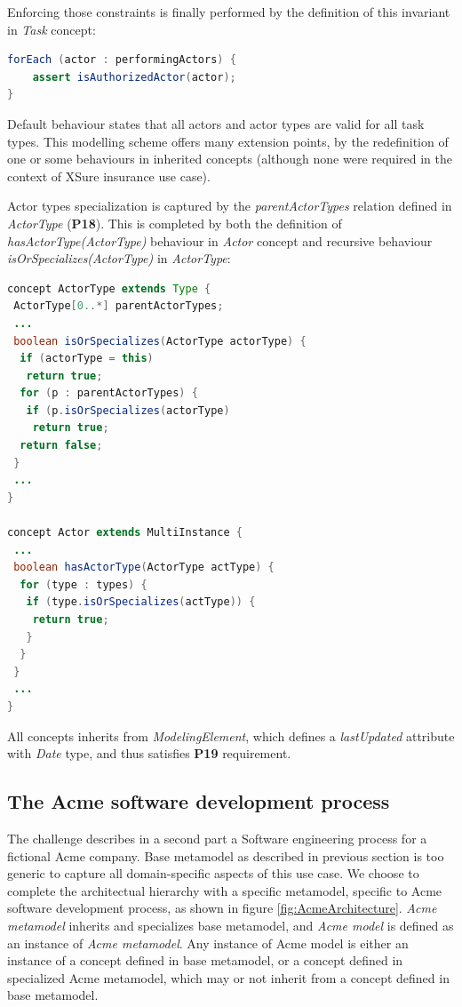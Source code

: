Enforcing those constraints is finally performed by the definition of this invariant in \textit{Task} concept:

\begin{lstlisting}[breaklines=true, language=java, basicstyle=\ttfamily\scriptsize, mathescape=true]
forEach (actor : performingActors) {
    assert isAuthorizedActor(actor);
}
\end{lstlisting}

Default behaviour states that all actors and actor types are valid for all task types. This modelling scheme offers many extension points, by the redefinition of one or some behaviours in inherited concepts (although none were required in the context of XSure insurance use case).

Actor types specialization is captured by the \textit{parentActorTypes} relation defined in \textit{ActorType} (\textbf{P18}). This is completed by both the definition of \textit{hasActorType(ActorType)} behaviour in \textit{Actor} concept and recursive behaviour \textit{isOrSpecializes(ActorType)} in \textit{ActorType}:

\begin{lstlisting}[breaklines=true, language=java, basicstyle=\ttfamily\scriptsize, mathescape=true]
concept ActorType extends Type {
 ActorType[0..*] parentActorTypes;
 ...
 boolean isOrSpecializes(ActorType actorType) {    
  if (actorType = this)   
   return true;      
  for (p : parentActorTypes) {      
   if (p.isOrSpecializes(actorType)
    return true;        
  return false;    
 }
 ...
}

concept Actor extends MultiInstance {
 ...
 boolean hasActorType(ActorType actType) {      
  for (type : types) {
   if (type.isOrSpecializes(actType)) {
    return true;
   }
  }     
 }  
 ...
}
\end{lstlisting}

All concepts inherits from \textit{ModelingElement}, which defines a \textit{lastUpdated} attribute with \textit{Date} type, and thus satisfies \textbf{P19} requirement. 

\subsection{The Acme software development process}
\label{sec:AcmeSoftwareDevelopmentProcess}

The challenge describes in a second part a Software engineering process for a fictional Acme company. Base metamodel as described in previous section is too generic to capture all domain-specific aspects of this use case. We choose to complete the architectual hierarchy with a specific metamodel, specific to Acme software development process, as shown in figure \ref{fig:AcmeArchitecture}. \textit{Acme metamodel} inherits and specializes base metamodel, and \textit{Acme model} is defined as an instance of \textit{Acme metamodel}. Any instance of Acme model is either an instance of a concept defined in base metamodel, or a concept defined in specialized Acme metamodel, which may or not inherit from a concept defined in base metamodel.

